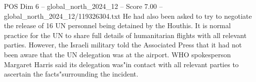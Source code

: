\begin{textsample}{POS Dim 6 – global\_north\_2024\_12 – Score 7.00 – global\_north\_2024\_12/119326304.txt}
He had also been asked to try to negotiate the release of 16 UN personnel being detained by the Houthis.
It is normal practice for the UN to share full details of humanitarian flights with all relevant parties.
However, the Israeli military told the Associated Press that it had not been aware that the UN delegation was at the airport.
WHO spokesperson Margaret Harris said its delegation was"in contact with all relevant parties to ascertain the facts"surrounding the incident.

\end{textsample}
